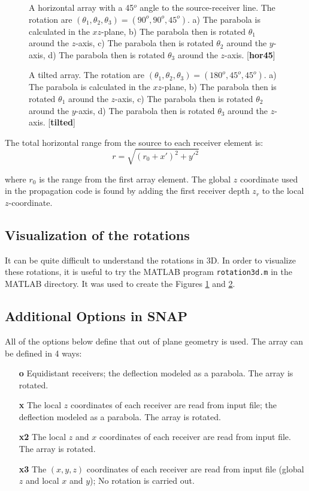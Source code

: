 \documentclass{saclantc}
\newcommand{\figcap}[2]{   \begin{figure}
      \epsfxsize=14cm \centerline{\epsfbox{figures/#1}}
      \caption{#2 [{\bf #1}]}  \label{#1}  %
\end{figure}}
\begin{document}
\figcap{hor45}{A horizontal array  with a 45$^o$ angle to the
source-receiver line. The rotation are $(\theta_1, \theta_2,
\theta_3 ) = (90^o, 90^o , 45^o)$.
a) The parabola is calculated in the $xz$-plane,
b) The parabola then is rotated $\theta_1$ around the $z$-axis,
c) The parabola then is rotated $\theta_2$ around the $y$-axis,
d) The parabola then is rotated $\theta_3$ around the $z$-axis.
}
\figcap{tilted}{A tilted array. The rotation are $(\theta_1, \theta_2,
\theta_3 ) = (180^o, 45^o , 45^o)$.
a) The parabola is calculated in the $xz$-plane,
b) The parabola then is rotated $\theta_1$ around the $z$-axis,
c) The parabola then is rotated $\theta_2$ around the $y$-axis,
d) The parabola then is rotated $\theta_3$ around the $z$-axis.
}

The total horizontal range from the source to each receiver element is:
\begin{equation}
r=\sqrt{ (r_0 + x')^2 + {y'}^2  }
\end{equation}

where $r_0$ is the range from the first array element.
The global $z$ coordinate used in the propagation code is found by
adding the first receiver depth $z_r$ to the local $z$-coordinate.

\clearpage
\subsection{Visualization of the rotations}
It can be quite difficult to understand the rotations in 3D. In order to
visualize these rotations, it is useful to try the {\sc MATLAB} program 
{\tt rotation3d.m} in the {\sc MATLAB} directory. It was used to create the
Figures \ref{hor45} and \ref{tilted}.

\subsection{Additional Options in SNAP}
All of the options below define that out of plane geometry is used.
The array can be defined in 4 ways:
\begin{itemize}
\item[\bf o] Equidistant receivers; the deflection modeled as a
parabola. The array is rotated.
\item[\bf x] The  local $z$ coordinates of each receiver are read from input file; the deflection modeled as a parabola.  The array is rotated.
\item[\bf x2] The  local $z$ and $x$ coordinates of each receiver are read
from input file. The array is rotated.
\item[\bf x3]  The $(x,y,z)$ coordinates of each receiver are read
from input file (global $z$ and local $x$ and $y$); No rotation is carried out.
\end{itemize}
\end{document}
